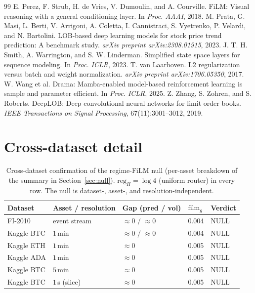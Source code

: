 \documentclass{article}
\newcommand{\filmG}{\mathrm{film}_g}
\newcommand{\regH}{\mathrm{reg}_H}
\begin{document}
\begin{thebibliography}{99}
 E. Perez, F. Strub, H. de Vries, V. Dumoulin, and A. Courville. FiLM: Visual reasoning with a general conditioning layer. In \emph{Proc. AAAI}, 2018.
 M. Prata, G. Masi, L. Berti, V. Arrigoni, A. Coletta, I. Cannistraci, S. Vyetrenko, P. Velardi, and N. Bartolini. LOB-based deep learning models for stock price trend prediction: A benchmark study. \emph{arXiv preprint arXiv:2308.01915}, 2023.
 J. T. H. Smith, A. Warrington, and S. W. Linderman. Simplified state space layers for sequence modeling. In \emph{Proc. ICLR}, 2023.
 T. van Laarhoven. L2 regularization versus batch and weight normalization. \emph{arXiv preprint arXiv:1706.05350}, 2017.
 W. Wang et al. Drama: Mamba-enabled model-based reinforcement learning is sample and parameter efficient. In \emph{Proc. ICLR}, 2025.
 Z. Zhang, S. Zohren, and S. Roberts. DeepLOB: Deep convolutional neural networks for limit order books. \emph{IEEE Transactions on Signal Processing}, 67(11):3001--3012, 2019.
\end{thebibliography}

\appendix
\section{Cross-dataset detail}\label{app:cross}
\begin{table}[h]
\centering
\small
\begin{tabular}{lllll}
\toprule
Dataset & Asset / resolution & Gap (pred / vol) & $\filmG$ & Verdict \\
\midrule
FI-2010 & event stream & $\approx0$ / $\approx0$ & 0.004 & NULL \\
Kaggle BTC & $1\,$min & $\approx0$ / $\approx0$ & 0.004 & NULL \\
Kaggle ETH & $1\,$min & $\approx0$ & 0.005 & NULL \\
Kaggle ADA & $1\,$min & $\approx0$ & 0.005 & NULL \\
Kaggle BTC & $5\,$min & $\approx0$ & 0.005 & NULL \\
Kaggle BTC & $1\,$s (slice) & $\approx0$ & 0.005 & NULL \\
\bottomrule
\end{tabular}
\caption{Cross-dataset confirmation of the regime-FiLM null (per-asset breakdown of the summary in Section~\ref{sec:null}). $\regH=\log4$ (uniform router) in every row. The null is dataset-, asset-, and resolution-independent.}
\label{tab:crossdataset}
\end{table}
\end{document}
